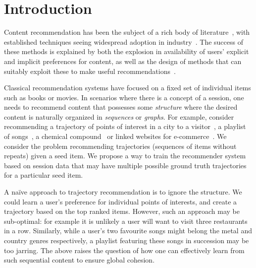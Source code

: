 
\section{Introduction}
\label{sec:intro}

Content recommendation has been the subject of a rich body of literature~\citep{Goldberg:1992,Sarwar:2001,Koren:2010},
with established techniques seeing widespread adoption in industry~\citep{Linden:2003,Agarwal:2013,Amatriain:2015,Gomez-Uribe:2015}.
The success of these methods is explained by both the explosion in availability of users' explicit and implicit preferences for content,
as well as the design of methods that can suitably exploit these to make useful recommendations~\citep{Koren:2009}.

Classical recommendation systems have focused on a fixed set of individual items such as books or movies. In scenarios where there is a concept of a session,
one needs to recommend content that possesses some \emph{structure}
where the desired content is naturally organized in
\emph{sequences} or {\em graphs}.
For example, consider %
recommending a trajectory of points of interest in a city to a visitor~\citep{lu2010photo2trip,lu2012personalized,ijcai15,cikm16paper},
a playlist of songs~\citep{McFee:2011,chen2012playlist,hidasi2015session,choi2016towards},
a chemical compound~\cite{dehaspe1998finding} or linked websites for e-commerce~\cite{antikacioglu2015recommendation}.
We consider the problem recommending trajectories (sequences of items
without repeats) given a seed item.
We propose a way to train the recommender system based on session data that may
have multiple possible ground truth trajectories for a particular seed item.

A na\"{i}ve approach to trajectory recommendation is to ignore the structure.
We could learn a user's preference for individual points of interests,
and create a trajectory based on the top ranked items.
However, such an approach may be sub-optimal:
for example
it is unlikely a user will want to visit three restaurants in a row.
Similarly,
while a user's two favourite songs might belong
the metal and country genres respectively,
a playlist featuring these songs in succession may be too jarring.
The above raises the question of how one can effectively learn from such sequential content to ensure global cohesion.

